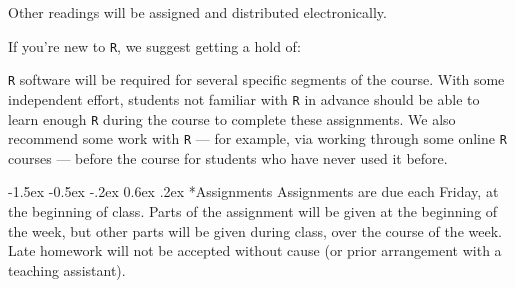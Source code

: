 \documentclass[12pt]{article}
\makeatletter
\renewcommand\subsection{\@startsection{subsection}{2}{\z@}%
  {-1.5ex \@plus -0.5ex \@minus -.2ex}%
  {0.6ex \@plus .2ex}%
  {\normalfont\large\bfseries}}
\makeatother
\begin{document}







Other readings will be assigned and distributed electronically.

If you're new to \texttt{R}, we suggest getting a hold of:

\begin{verse}   \end{verse}

\begin{verse}  \end{verse}

\texttt{R} software will be required for several specific segments of the course. With some independent effort, students not familiar with \texttt{R} in advance should be able to learn enough \texttt{R} during the course to complete these assignments. We also recommend some work with \texttt{R} --- for example, via working through some online \texttt{R} courses --- before the course for students who have never used it before.

\subsection*{Assignments}
Assignments are due each Friday, at the beginning of
class. Parts of the assignment will be given at the beginning of the week, but other parts will be given during class, over the course of the week.  Late homework will not be accepted without cause (or prior arrangement with a teaching assistant).
\end{document}

